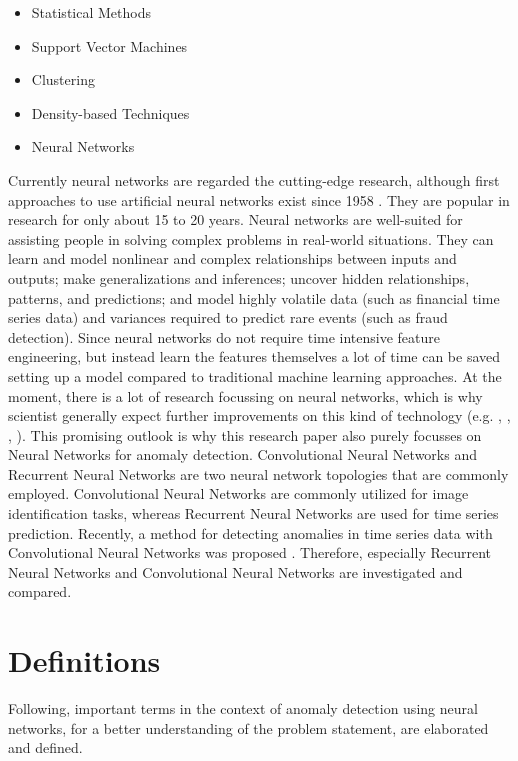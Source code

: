 \begin{itemize}
	\item Statistical Methods
	\item Support Vector Machines
	\item Clustering 
	\item Density-based Techniques
	\item Neural Networks 
\end{itemize}

Currently neural networks are regarded the cutting-edge research, although first approaches to use artificial neural networks exist since 1958 \parencite{Rosenblatt1958}. They are popular in research for only about 15 to 20 years. Neural networks are well-suited for assisting people in solving complex problems in real-world situations. They can learn and model nonlinear and complex relationships between inputs and outputs; make generalizations and inferences; uncover hidden relationships, patterns, and predictions; and model highly volatile data (such as financial time series data) and variances required to predict rare events (such as fraud detection). Since neural networks do not require time intensive feature engineering, but instead learn the features themselves a lot of time can be saved setting up a model compared to traditional machine learning approaches. At the moment, there is a lot of research focussing on neural networks, which is why scientist generally expect further improvements on this kind of technology (e.g. \parencite{Braei2020}, \parencite{Thabtah2020}, \parencite{Verner2019}, \parencite{Wen2019}). This promising outlook is why this research paper also purely focusses on Neural Networks for anomaly detection. Convolutional Neural Networks and Recurrent Neural Networks are two neural network topologies that are commonly employed. Convolutional Neural Networks are commonly utilized for image identification tasks, whereas Recurrent Neural Networks are used for time series prediction. Recently, a method for detecting anomalies in time series data with Convolutional Neural Networks was proposed \parencite{Wen2019}. Therefore, especially Recurrent Neural Networks and Convolutional Neural Networks are investigated and compared.


\section{Definitions}
Following, important terms in the context of anomaly detection using neural networks, for a better understanding of the problem statement, are elaborated and defined. 

